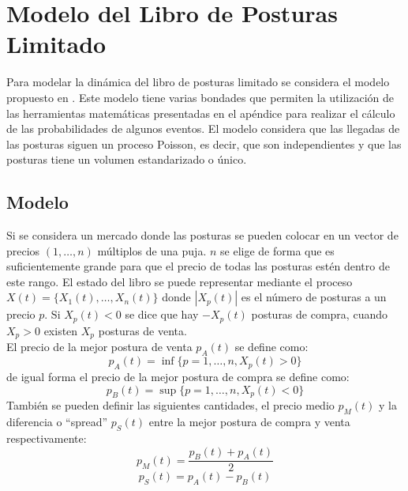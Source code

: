 \documentclass[11pt]{article}
\numberwithin{equation}{section} %
\begin{document}
\clearpage

\section{Modelo del Libro de Posturas Limitado}

Para modelar la dinámica del libro de posturas limitado se considera el modelo propuesto en \cite{Cont2010}. Este modelo tiene varias bondades que permiten la utilización de las herramientas matemáticas presentadas en el apéndice para realizar el cálculo de las probabilidades de algunos eventos. El modelo considera que las llegadas de las posturas siguen un proceso Poisson, es decir, que son independientes y que las posturas tiene un volumen estandarizado o único.\\

\subsection{Modelo}

Si se considera un mercado donde las posturas se pueden colocar en un vector de precios $\left(1,\ldots,n\right)$ múltiplos de una puja. $n$ se elige de forma que es suficientemente grande para que el precio de todas las posturas estén dentro de este rango. El estado del libro se puede representar mediante el proceso $X(t)=\{X_1(t),\ldots,X_n(t)\}$ donde $|X_p(t)|$ es el número de posturas a un precio $p$. Si $X_p(t)<0$ se dice que hay $-X_p(t)$ posturas de compra, cuando $X_p>0$ existen $X_p$ posturas de venta.\\

El precio de la mejor postura de venta $p_A(t)$ se define como:
\[
p_A(t)= \inf\{p=1,\ldots,n,X_p(t)>0\}
\]
de igual forma el precio de la mejor postura de compra se define como:
\[
p_B(t)= \sup\{p=1,\ldots,n,X_p(t)<0\}
\]
También se pueden definir las siguientes cantidades, el precio medio $p_M(t)$ y la diferencia o ``spread'' $p_S(t)$ entre la mejor postura de compra y venta respectivamente:
\[
p_M(t)=\frac{p_B(t)+p_A(t)}{2}
\]
\[
p_S(t)=p_A(t)-p_B(t)
\]\\
\end{document}
